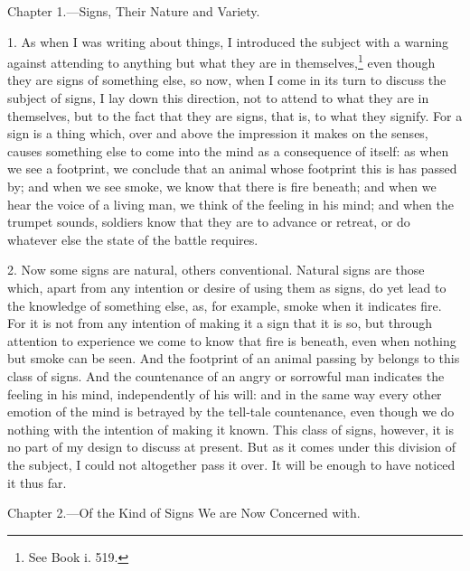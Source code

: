 
Chapter 1.—Signs, Their Nature and Variety.

1. As when I was writing about things, I introduced the subject with a warning against attending to anything but what they are in themselves,\footnote{See Book i. 519.} even though they are signs of something else, so now, when I come in its turn to discuss the subject of signs, I lay down this direction, not to attend to what they are in themselves, but to the fact that they are signs, that is, to what they signify. For a sign is a thing which, over and above the impression it makes on the senses, causes something else to come into the mind as a consequence of itself: as when we see a footprint, we conclude that an animal whose footprint this is has passed by; and when we see smoke, we know that there is fire beneath; and when we hear the voice of a living man, we think of the feeling in his mind; and when the trumpet sounds, soldiers know that they are to advance or retreat, or do whatever else the state of the battle requires.

2. Now some signs are natural, others conventional. Natural signs are those which, apart from any intention or desire of using them as signs, do yet lead to the knowledge of something else, as, for example, smoke when it indicates fire. For it is not from any intention of making it a sign that it is so, but through attention to experience we come to know that fire is beneath, even when nothing but smoke can be seen. And the footprint of an animal passing by belongs to this class of signs. And the countenance of an angry or sorrowful man indicates the feeling in his mind, independently of his will: and in the same way every other emotion of the mind is betrayed by the tell-tale countenance, even  though we do nothing with the intention of making it known. This class of signs, however, it is no part of my design to discuss at present. But as it comes under this division of the subject, I could not altogether pass it over. It will be enough to have noticed it thus far.


Chapter 2.—Of the Kind of Signs We are Now Concerned with.

